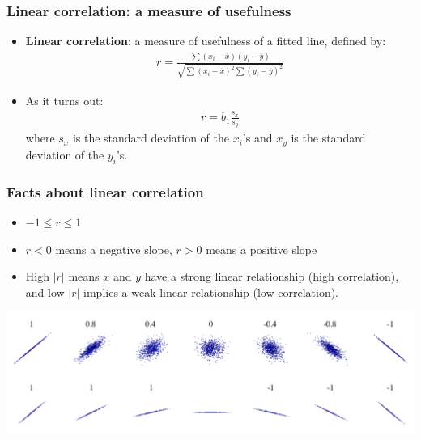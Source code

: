 \documentclass[handout]{beamer}\usepackage[]{graphicx}\usepackage[]{color}
\providecommand{\ov}[1]{\overline{#1}}
\numberwithin{equation}{section}
\begin{document}
\begin{frame}
\frametitle{Linear correlation: a measure of usefulness}
\begin{itemize}
\item {\bf Linear correlation}: a measure of usefulness of a fitted line, defined by:
\pause \begin{align*}
r = \frac{\sum(x_i - \ov{x})(y_i - \ov{y})}{\sqrt{\sum (x_i - \ov{x})^2 \sum (y_i - \ov{y})^2}}
\end{align*}
\pause \item As it turns out:
\begin{align*}
r = b_1\frac{s_x}{s_y}
\end{align*}
where $s_x$ is the standard deviation of the $x_i$'s and $x_y$ is the standard deviation of the $y_i$'s. 
\end{itemize}
\end{frame}

\begin{frame}
\frametitle{Facts about linear correlation}
\begin{itemize}
\item $-1 \le r \le 1$
\pause \item $r < 0$ means a negative slope, $r > 0$ means a positive slope
\pause \item High $|r|$ means $x$ and $y$ have a strong linear relationship (high correlation), and low $|r|$ implies a weak linear relationship (low correlation).
\end{itemize}

 \includegraphics{../../fig/diffcorrs.png}
\end{frame}
\end{document}
